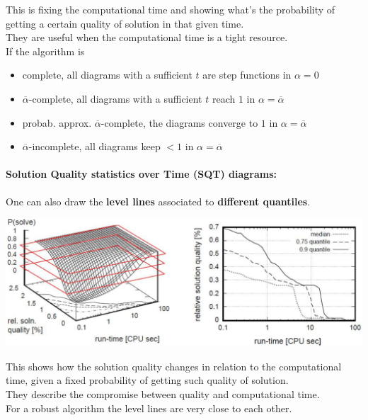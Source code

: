 \documentclass[11pt]{article}
\begin{document}
	This is fixing the computational time and showing what's the probability of getting a certain quality of solution in that given time.\\
	
	They are useful when the computational time is a tight resource.\\
	
	If the algorithm is
	\begin{itemize}
		\item complete, all diagrams with a sufficient $t$ are step functions in $\alpha = 0$
		\item $\overline{\alpha}$-complete, all diagrams with a sufficient $t$ reach $1$ in $\alpha = \overline{\alpha}$
		\item probab. approx. $\overline{\alpha}$-complete, the diagrams converge to $1$ in $\alpha = \overline{\alpha}$
		\item $\overline{\alpha}$-incomplete, all diagrams keep $< 1$ in $\alpha = \overline{\alpha}$
	\end{itemize}
	
	\newpage
	
	\paragraph{Solution Quality statistics over Time (SQT) diagrams:} One can also draw the \textbf{level lines} associated to \textbf{different quantiles}. 
	\begin{center}
		\includegraphics[width=\columnwidth]{img/SQT1}
	\end{center}
	
	This shows how the solution quality changes in relation to the computational time, given a fixed probability of getting such quality of solution. \\
	
	They describe the compromise between quality and computational time.\\
	
	For a robust algorithm the level lines are very close to each other.\\
	
\end{document}
